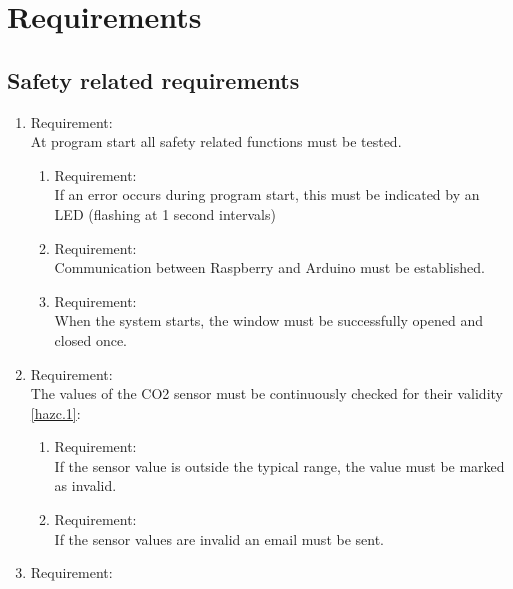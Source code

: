 \section{Requirements}
\label{chapter4}


\subsection{Safety related requirements}

	\begin{enumerate}[label*=\arabic*.]
		\item \label{req.1}  Requirement: \\
		At program start all safety related functions must be tested.  \\
		\begin{enumerate}[label*=\arabic*.]
			\item \label{req.1.1}  Requirement:  \\
			If an error occurs during program start, this must be indicated by an LED (flashing at 1 second intervals)\\ 
			\item \label{req.1.2} Requirement:   \\
			Communication between Raspberry and Arduino must be established.\\ 
			\item \label{req.1.3} Requirement:   \\
			When the system starts, the window must be successfully opened and closed once.\\    
		\end{enumerate}
		\item \label{req.2}  Requirement:  \\
         The values of the CO2 sensor must be continuously checked for their validity \ref{hazc.1}: \\
  	\begin{enumerate}[label*=\arabic*.]
			\item \label{req.2.1}  Requirement:  \\
			If the sensor value is outside the typical range, the value must be marked as invalid.\\ 
   		\item \label{req.2.1}  Requirement:  \\
			If the sensor values are invalid an email must be sent.\\
	  \end{enumerate}
		\item \label{req.3}  Requirement:  \\

\end{enumerate}
